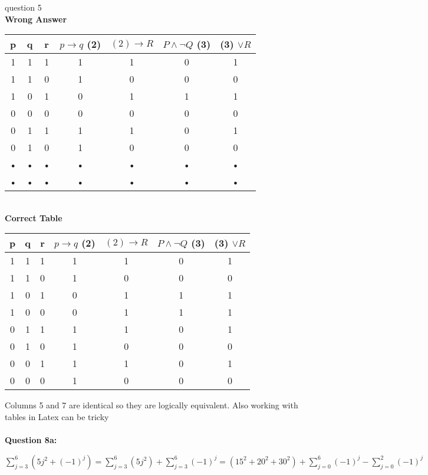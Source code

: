 \documentclass[11pt]{article}
\begin{document}
question 5\\

\textbf{Wrong Answer}

\begin{tabular}{|c|c|c|c|c|c|c|}
\hline 
p & q & r & $p \rightarrow q$ (2) & $ (2) \rightarrow R$ & $P \land \neg Q$ (3) & (3) $\lor R$ \\ 
\hline 
1 & 1 & 1 & 1 & 1 & 0 & 1 \\ 
\hline 
1 & 1 & 0 & 1 & 0 & 0 & 0 \\ 
\hline 
1 & 0 & 1 & 0 & 1 & 1 & 1 \\ 
\hline 
0 & 0 & 0 & 0 & 0 & 0 & 0 \\ 
\hline 
0 & 1 & 1 & 1 & 1 & 0 & 1 \\ 
\hline 
0 & 1 & 0 & 1 & 0 & 0 & 0 \\ 
\hline 
• & • & • & • & • & • & • \\ 
\hline 
• & • & • & • & • & • & • \\ 
\hline 
\end{tabular} \\

\textbf{Correct Table}

\begin{tabular}{|c|c|c|c|c|c|c|}
\hline 
p & q & r & $p \rightarrow q$ (2) & $ (2) \rightarrow R$ & $P \land \neg Q$ (3) & (3) $\lor R$ \\ 
\hline 
1 & 1 & 1 & 1 & 1 & 0 & 1 \\ 
\hline 
1 & 1 & 0 & 1 & 0 & 0 & 0 \\ 
\hline 
1 & 0 & 1 & 0 & 1 & 1 & 1 \\ 
\hline 
1 & 0 & 0 & 0 & 1 & 1 & 1 \\ 
\hline 
0 & 1 & 1 & 1 & 1 & 0 & 1 \\ 
\hline 
0 & 1 & 0 & 1 & 0 & 0 & 0 \\ 
\hline 
0 & 0 & 1 & 1 & 1 & 0 & 1 \\ 
\hline 
0 & 0 & 0 & 1 & 0 & 0 & 0 \\ 
\hline 
\end{tabular}

Columns 5 and 7 are identical so they are logically equivalent. Also working with tables in Latex can be tricky\\

\hrulefill\\

\textbf{Question 8a:}

$\sum_{j=3}^6 (5j^2+(-1)^j) = \sum_{j=3}^6 (5j^2) + \sum_{j=3}^6 (-1)^j = (15^2+20^2+30^2)+ \sum_{j=0}^6 (-1)^j - \sum_{j=0}^2 (-1)^j $
\end{document}
